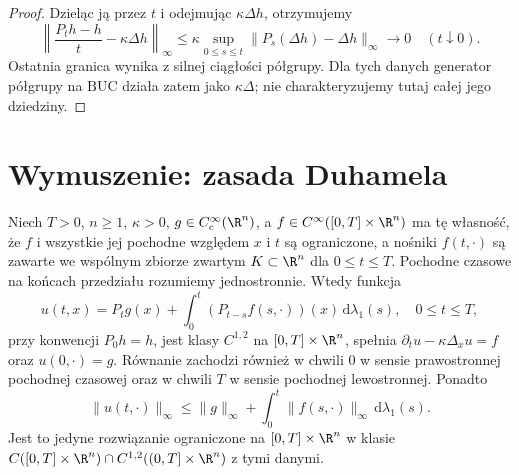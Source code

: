 \begin{proof}
Dzieląc ją przez $t$ i odejmując $\kappa\Delta h$,
otrzymujemy
\[
 \left\|\frac{P_th-h}{t}-\kappa\Delta h\right\|_\infty
 \leq\kappa\sup_{0\leq s\leq t}
 \|P_s(\Delta h)-\Delta h\|_\infty
 \longrightarrow0\quad(t\downarrow0).
\]
Ostatnia granica wynika z silnej ciągłości półgrupy.
Dla tych danych generator półgrupy na $\mathrm{BUC}$
działa zatem jako $\kappa\Delta$; nie charakteryzujemy
tutaj całej jego dziedziny.
\end{proof}

\section{Wymuszenie: zasada Duhamela}
\label{sec:pde4-duhamel}

\begin{twierdzenie}
\label{thm:pde4-duhamel}
Niech $T>0$, $n\geq1$, $\kappa>0$, $g\in C_c^\infty(\R^n)$,
a $f\in C^\infty([0,T]\times\R^n)$ ma tę własność, że
$f$ i wszystkie jej pochodne względem $x$ i $t$ są
ograniczone, a nośniki $f(t,\cdot)$ są zawarte
we wspólnym zbiorze zwartym $K\subset\R^n$
dla $0\leq t\leq T$. Pochodne czasowe na końcach
przedziału rozumiemy jednostronnie.
Wtedy funkcja
\begin{equation}\label{eq:pde4-duhamel}
 u(t,x)=P_tg(x)+\int_0^t(P_{t-s}f(s,\cdot))(x)
 \,\mathrm d\lambda_1(s),\quad 0\leq t\leq T,
\end{equation}
przy konwencji $P_0h=h$, jest klasy $C^{1,2}$
na $[0,T]\times\R^n$, spełnia
$\partial_tu-\kappa\Delta_xu=f$ oraz $u(0,\cdot)=g$.
Równanie zachodzi również w chwili $0$ w sensie
prawostronnej pochodnej czasowej oraz w chwili $T$
w sensie pochodnej lewostronnej. Ponadto
\begin{equation}\label{eq:pde4-duhamel-bound}
 \|u(t,\cdot)\|_\infty\leq\|g\|_\infty+
 \int_0^t\|f(s,\cdot)\|_\infty\,\mathrm d\lambda_1(s).
\end{equation}
Jest to jedyne rozwiązanie ograniczone na
$[0,T]\times\R^n$ w klasie
$C([0,T]\times\R^n)\cap C^{1,2}((0,T]\times\R^n)$
z tymi danymi.
\end{twierdzenie}
